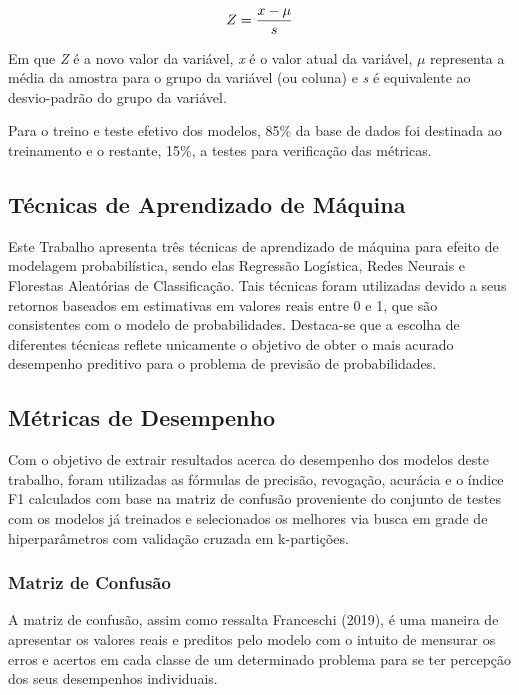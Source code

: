 \documentclass[english, spanish, brazilian]{RBIEarticle} %
\begin{document}
\vspace{0.5cm}
\begin{equation}
\large Z = \frac{x-\mu}{s}
\end{equation}
\vspace{0.5cm}

Em que \textit{Z} é a novo valor da variável, \textit{x} é o valor atual da variável, $\mu$ representa a média da amostra para o grupo da variável (ou coluna) e \textit{s} é equivalente ao desvio-padrão do grupo da variável.

Para o treino e teste efetivo dos modelos, 85\% da base de dados foi destinada ao treinamento e o restante, 15\%, a testes para verificação das métricas. 

\subsection{Técnicas de Aprendizado de Máquina}
Este Trabalho apresenta três técnicas de aprendizado de máquina para efeito de modelagem probabilística, sendo elas Regressão Logística, Redes Neurais e Florestas Aleatórias de Classificação. Tais técnicas foram utilizadas devido a seus retornos baseados em estimativas em valores reais entre 0 e 1, que são consistentes com o modelo de probabilidades. Destaca-se que a escolha de diferentes técnicas reflete unicamente o objetivo de obter o mais acurado desempenho preditivo para o problema de previsão de probabilidades.

\subsection{Métricas de Desempenho}
Com o objetivo de extrair resultados acerca do desempenho dos modelos deste trabalho, foram utilizadas as fórmulas de precisão, revogação, acurácia e o índice F1 calculados com base na matriz de confusão proveniente do conjunto de testes com os modelos já treinados e selecionados os melhores via busca em grade de hiperparâmetros com validação cruzada em k-partições.


\subsubsection{Matriz de Confusão}
A matriz de confusão, assim como ressalta Franceschi (2019), é uma maneira de apresentar os valores reais e preditos pelo modelo com o intuito de mensurar os erros e acertos em cada classe de um determinado problema para se ter percepção dos seus desempenhos individuais.
\end{document}
